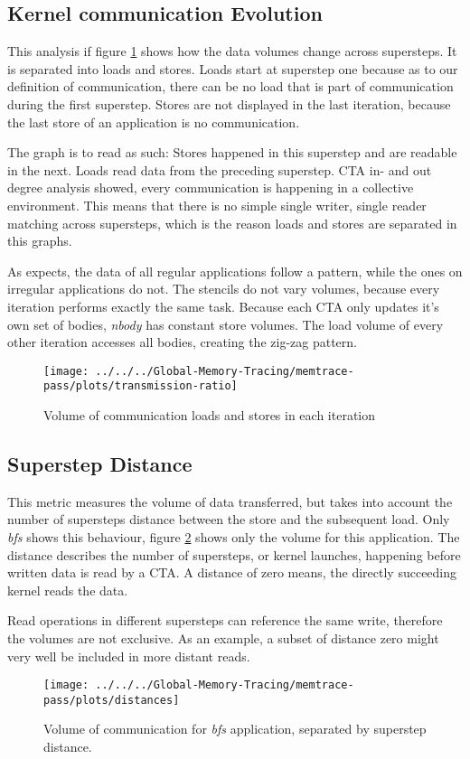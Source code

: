 \subsection{Kernel communication Evolution}
This analysis if figure \ref{trans-ratio} shows how the data volumes change across supersteps. It is separated into loads and stores. Loads start at superstep one because as to our definition of communication, there can be no load that is part
of communication during the first superstep. Stores are not displayed in the last iteration, because the last store of an application is no communication.

The graph is to read as such: Stores happened in this superstep and are readable in the next. Loads read data from the preceding superstep. CTA in- and out degree analysis showed, every communication is happening in a collective environment. This means that there is no simple single writer, single reader matching across supersteps, which is the reason loads and stores are separated in this graphs.

As expects, the data of all regular applications follow a pattern, while the ones on irregular applications do not. The stencils do not
vary volumes, because every iteration performs exactly the same task. Because each CTA only updates
it's own set of bodies, \textit{nbody} has constant store volumes. The load volume of every other iteration accesses all bodies, creating the zig-zag pattern.
\begin{figure}[h!]
	\centering
	\texttt{[image: ../../../Global-Memory-Tracing/memtrace-pass/plots/transmission-ratio]}
	\caption{Volume of communication loads and stores in each iteration}
	\label{trans-ratio}
\end{figure}
\subsection{Superstep Distance}
This metric measures the volume of data transferred, but takes into account the number of supersteps distance between the store and the subsequent load. Only \textit{bfs} shows this behaviour,
figure \ref{trans-distance} shows only the volume for this application. The distance describes the number
of supersteps, or kernel launches, happening before written data is read by a CTA. A distance of zero means, the directly succeeding kernel reads the data.

Read operations in different supersteps can reference the same write, therefore the volumes are not exclusive.
As an example, a subset of distance zero might very well be included in more distant reads.
\begin{figure}[t]
	\centering
	\texttt{[image: ../../../Global-Memory-Tracing/memtrace-pass/plots/distances]}
	\caption{Volume of communication for \textit{bfs} application, separated by superstep distance.}
	\label{trans-distance}
\end{figure}
